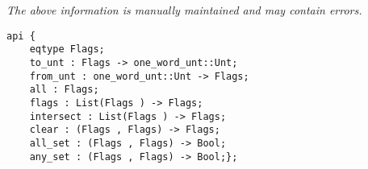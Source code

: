 \label{api:Bit\_Flags}

{\tiny \it The above information is manually maintained and may contain errors.}
\begin{verbatim}
api {
    eqtype Flags;
    to_unt : Flags -> one_word_unt::Unt;
    from_unt : one_word_unt::Unt -> Flags;
    all : Flags;
    flags : List(Flags ) -> Flags;
    intersect : List(Flags ) -> Flags;
    clear : (Flags , Flags) -> Flags;
    all_set : (Flags , Flags) -> Bool;
    any_set : (Flags , Flags) -> Bool;};
\end{verbatim}
